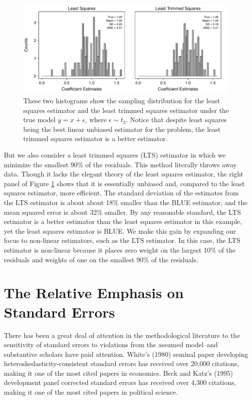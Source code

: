 \documentclass[12pt]{article}
\begin{document}
\begin{figure}[h!]
\begin{center}
\includegraphics[scale = .7]{figs/lts-illustration.pdf}
\caption{These two histograms show the sampling distribution for the least squares estimator and the least trimmed squares estimator under the true model $y = x + \epsilon$, where $\epsilon \sim t_3$. 
Notice that despite least squares being the best linear unbiased estimator for the problem, the least trimmed squares estimator is a better estimator.}\label{fig:lts-illustration}
\end{center}
\end{figure}

But we also consider a least trimmed squares (LTS) estimator in which we minimize the smallest 90\% of the residuals. 
This method literally throws away data. 
Though it lacks the elegant theory of the least squares estimator, the right panel of Figure \ref{fig:lts-illustration} shows that it is essentially unbiased and, compared to the least squares estimator, more efficient. 
The standard deviation of the estimates from the LTS estimator is about about 18\% smaller than the BLUE estimator, and the mean squared error is about 32\% smaller. 
By any reasonable standard, the LTS estimator is a better estimator than the least squares estimator in this example, yet the least squares estimator is BLUE. 
We make this gain by expanding our focus to non-linear estimators, such as the LTS estimator. 
In this case, the LTS estimator is non-linear because it places zero weight on the largest 10\% of the residuals and weights of one on the smallest 90\% of the residuals.

\section*{The Relative Emphasis on Standard Errors}

There has been a great deal of attention in the methodological literature to the sensitivity of standard errors to violations from the assumed model--and substantive scholars have paid attention.
White's (1980) seminal paper developing heteroskedasticity-consistent standard errors has received over 20,000 citations, making it one of the most cited papers in economics.
Beck and Katz's (1995) development panel corrected standard errors has received over 4,300 citations, making it one of the most cited papers in political science.
\end{document}
